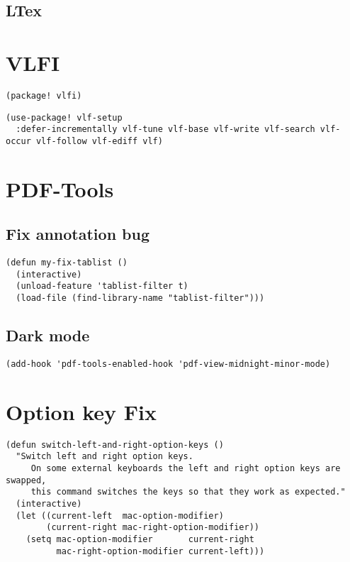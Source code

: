 \documentclass[c]{article}
\theoremstyle{plain}%
\theoremstyle{definition}
\theoremstyle{remark}
\begin{document}
\subsection{LTex}
\label{sec:org2475fdb}
\section{VLFI}
\label{sec:org1091ca2}
\begin{verbatim}
(package! vlfi)
\end{verbatim}
\begin{verbatim}
(use-package! vlf-setup
  :defer-incrementally vlf-tune vlf-base vlf-write vlf-search vlf-occur vlf-follow vlf-ediff vlf)
\end{verbatim}

\section{PDF-Tools}
\label{sec:orgc2bb9e6}
\subsection{Fix annotation bug}
\label{sec:org5c3de9c}
\begin{verbatim}
(defun my-fix-tablist ()
  (interactive)
  (unload-feature 'tablist-filter t)
  (load-file (find-library-name "tablist-filter")))
\end{verbatim}
\subsection{Dark mode}
\label{sec:org3cdcd5e}
\begin{verbatim}
(add-hook 'pdf-tools-enabled-hook 'pdf-view-midnight-minor-mode)
\end{verbatim}
\section{Option key Fix}
\label{sec:org4b455b9}
\begin{verbatim}
(defun switch-left-and-right-option-keys ()
  "Switch left and right option keys.
     On some external keyboards the left and right option keys are swapped,
     this command switches the keys so that they work as expected."
  (interactive)
  (let ((current-left  mac-option-modifier)
        (current-right mac-right-option-modifier))
    (setq mac-option-modifier       current-right
          mac-right-option-modifier current-left)))
\end{verbatim}
\end{document}
